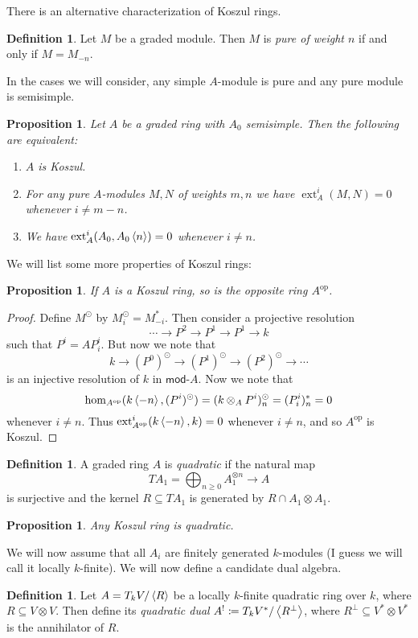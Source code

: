 \documentclass{amsart}
\newtheorem{prop}[thm]{Proposition}
\theoremstyle{definition}
\newtheorem{defn}[thm]{Definition}
\theoremstyle{remark}
\theoremstyle{plain}
\theoremstyle{definition}
\theoremstyle{remark}
\newcommand{\mr}[1]{\mathrm{#1}}
\newcommand{\ms}[1]{\mathsf{#1}}
\DeclareMathOperator{\ext}{ext}
\begin{document}
There is an alternative characterization of Koszul rings.
\begin{defn}
    Let $M$ be a graded module. Then $M$ is \textit{pure of weight $n$} if and only if $M = M_{-n}$.
\end{defn}
In the cases we will consider, any simple $A$-module is pure and any pure module is semisimple.
\begin{prop}
    Let $A$ be a graded ring with $A_0$ semisimple. Then the following are equivalent:
    \begin{enumerate}
        \item $A$ is Koszul.
        \item For any pure $A$-modules $M, N$ of weights $m, n$ we have $\ext^i_A(M, N) = 0$ whenever $i \neq m-n$.
        \item We have $\ext_A^i(A_0, A_0\ev{n}) = 0$ whenever $i \neq n$.
    \end{enumerate}
\end{prop}

We will list some more properties of Koszul rings:
\begin{prop}
    If $A$ is a Koszul ring, so is the opposite ring $A^{\mr{op}}$.
\end{prop}

\begin{proof}
    Define $M^{\odot}$ by $M^{\odot}_i = M_{-i}^*$. Then consider a projective resolution
    \[ \cdots \to P^2 \to P^1 \to P^1 \to k \]
    such that $P^i = AP_i^i$. But now we note that
    \[ k \to (P^0)^{\odot} \to (P^1)^{\odot} \to (P^2)^{\odot} \to \cdots \]
    is an injective resolution of $k$ in $\ms{mod}\text{-}A$. Now we note that
    \[ \hom_{A^{\mr{op}}}(k\ev{-n}, (P^i)^{\odot}) = (k \otimes_A P^i)_n^{\odot} = (P_i^i)_n^* = 0 \]
    whenever $i \neq n$. Thus $\ext_{A^{\mr{op}}}^i(k\ev{-n}, k) = 0$ whenever $i \neq n$, and so $A^{\mr{op}}$ is Koszul.
\end{proof}

\begin{defn}
    A graded ring $A$ is \textit{quadratic} if the natural map
    \[ T A_1 = \bigoplus_{n \geq 0} A_1^{\otimes n} \to A \]
    is surjective and the kernel $R \subseteq T A_1$ is generated by $R \cap A_1 \otimes A_1$.
\end{defn}

\begin{prop}
    Any Koszul ring is quadratic.
\end{prop}

We will now assume that all $A_i$ are finitely generated $k$-modules (I guess we will call it locally $k$-finite). We will now define a candidate dual algebra.
\begin{defn}
    Let $A = T_k V / \ev{R}$ be a locally $k$-finite quadratic ring over $k$, where $R \subseteq V \otimes V$. Then define its \textit{quadratic dual} $A^! \coloneqq T_k V^* / \ev{R^{\perp}}$, where $R^{\perp} \subseteq V^* \otimes V^*$ is the annihilator of $R$.
\end{defn}
\end{document}
